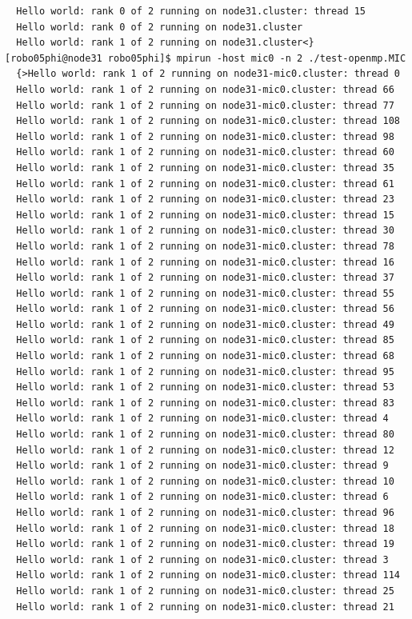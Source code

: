 \documentclass[pscyr,10pt]{hedlab}
\begin{document}
\begin{lstlisting}
  Hello world: rank 0 of 2 running on node31.cluster: thread 15
  Hello world: rank 0 of 2 running on node31.cluster
  Hello world: rank 1 of 2 running on node31.cluster<}
[robo05phi@node31 robo05phi]$ mpirun -host mic0 -n 2 ./test-openmp.MIC
  {>Hello world: rank 1 of 2 running on node31-mic0.cluster: thread 0
  Hello world: rank 1 of 2 running on node31-mic0.cluster: thread 66
  Hello world: rank 1 of 2 running on node31-mic0.cluster: thread 77
  Hello world: rank 1 of 2 running on node31-mic0.cluster: thread 108
  Hello world: rank 1 of 2 running on node31-mic0.cluster: thread 98
  Hello world: rank 1 of 2 running on node31-mic0.cluster: thread 60
  Hello world: rank 1 of 2 running on node31-mic0.cluster: thread 35
  Hello world: rank 1 of 2 running on node31-mic0.cluster: thread 61
  Hello world: rank 1 of 2 running on node31-mic0.cluster: thread 23
  Hello world: rank 1 of 2 running on node31-mic0.cluster: thread 15
  Hello world: rank 1 of 2 running on node31-mic0.cluster: thread 30
  Hello world: rank 1 of 2 running on node31-mic0.cluster: thread 78
  Hello world: rank 1 of 2 running on node31-mic0.cluster: thread 16
  Hello world: rank 1 of 2 running on node31-mic0.cluster: thread 37
  Hello world: rank 1 of 2 running on node31-mic0.cluster: thread 55
  Hello world: rank 1 of 2 running on node31-mic0.cluster: thread 56
  Hello world: rank 1 of 2 running on node31-mic0.cluster: thread 49
  Hello world: rank 1 of 2 running on node31-mic0.cluster: thread 85
  Hello world: rank 1 of 2 running on node31-mic0.cluster: thread 68
  Hello world: rank 1 of 2 running on node31-mic0.cluster: thread 95
  Hello world: rank 1 of 2 running on node31-mic0.cluster: thread 53
  Hello world: rank 1 of 2 running on node31-mic0.cluster: thread 83
  Hello world: rank 1 of 2 running on node31-mic0.cluster: thread 4
  Hello world: rank 1 of 2 running on node31-mic0.cluster: thread 80
  Hello world: rank 1 of 2 running on node31-mic0.cluster: thread 12
  Hello world: rank 1 of 2 running on node31-mic0.cluster: thread 9
  Hello world: rank 1 of 2 running on node31-mic0.cluster: thread 10
  Hello world: rank 1 of 2 running on node31-mic0.cluster: thread 6
  Hello world: rank 1 of 2 running on node31-mic0.cluster: thread 96
  Hello world: rank 1 of 2 running on node31-mic0.cluster: thread 18
  Hello world: rank 1 of 2 running on node31-mic0.cluster: thread 19
  Hello world: rank 1 of 2 running on node31-mic0.cluster: thread 3
  Hello world: rank 1 of 2 running on node31-mic0.cluster: thread 114
  Hello world: rank 1 of 2 running on node31-mic0.cluster: thread 25
  Hello world: rank 1 of 2 running on node31-mic0.cluster: thread 21

\end{lstlisting}
\end{document}
